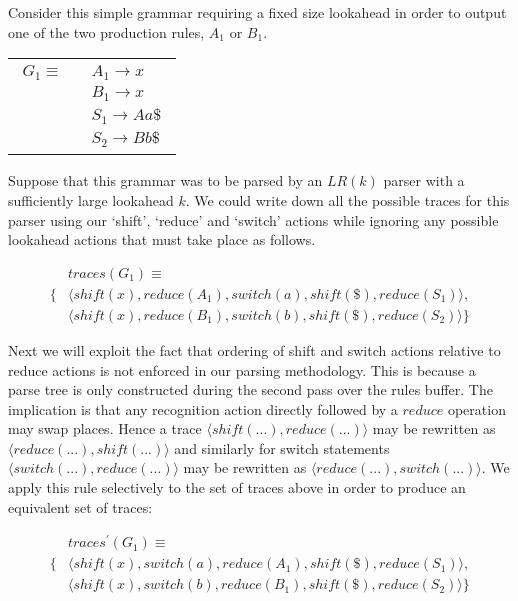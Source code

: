 \documentclass[a4paper,11pt]{article}
\begin{document}
Consider this simple grammar requiring a fixed size lookahead in order to output one of the two production rules, $A_1$ or $B_1$.

\begin{tabular}[t]{l}
\parbox{.3\textwidth}{
\begin{align*}
G_1 \equiv \quad & A_1 \rightarrow x\\
                 & B_1 \rightarrow x\\
                 & S_1 \rightarrow A a \$\\
                 & S_2 \rightarrow B b \$
\end{align*}}
\parbox{.6\textwidth}{}
\end{tabular}

Suppose that this grammar was to be parsed by an $LR(k)$ parser with a sufficiently large lookahead $k$. 
We could write down all the possible traces for this parser using our `shift', `reduce' and `switch' actions while ignoring any possible lookahead actions that must take place as follows.

{\small\parbox{.25\textwidth}{\begin{align*}
&traces(G_1) \equiv \\
\{ & \langle shift(x), reduce(A_1), switch(a), shift(\$), reduce(S_1) \rangle,\\
   & \langle shift(x), reduce(B_1), switch(b), shift(\$), reduce(S_2) \rangle \}
\end{align*}}}

Next we will exploit the fact that ordering of shift and switch actions relative to reduce actions is not enforced in our parsing methodology. This is because a parse tree is only constructed during the second pass over the rules buffer.
The implication is that any recognition action directly followed by a $reduce$ operation may swap places. 
Hence a trace $\langle shift(...), reduce(...) \rangle$ may be rewritten as $\langle reduce(...), shift(...) \rangle$ and similarly for switch statements $\langle switch(...), reduce(...) \rangle$ may be rewritten as $\langle reduce(...), switch(...) \rangle$.
We apply this rule selectively to the set of traces above in order to produce an equivalent set of traces:

{\small\parbox{.3\textwidth}{\begin{align*}
&traces^{\prime}(G_1) \equiv \\
\{ & \langle shift(x), switch(a), reduce(A_1), shift(\$), reduce(S_1) \rangle, \\
   & \langle shift(x), switch(b), reduce(B_1), shift(\$), reduce(S_2) \rangle \}
\end{align*}}}
\end{document}
